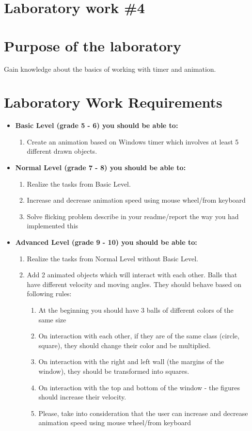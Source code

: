 \section*{Laboratory work \#4}

\section{Purpose of the laboratory}
Gain knowledge about the basics of working with timer and animation.
\section{Laboratory Work Requirements}
\begin{itemize}
\item \textbf{Basic Level (grade 5 - 6) you should be able to:}
	\begin{enumerate}
	\item Create an animation based on Windows timer which involves at least 5 different drawn objects.
    \end{enumerate}
	
\item \textbf{Normal Level (grade 7 - 8) you should be able to:}
    \begin{enumerate}
    \item Realize the tasks from Basic Level.
    \item Increase and decrease animation speed using mouse wheel/from keyboard
    \item Solve flicking problem describe in your readme/report the way you had implemented this
    \end{enumerate}
          
\item \textbf{Advanced Level (grade 9 - 10) you should be able to:}
    \begin{enumerate} 
    \item Realize the tasks from Normal Level without Basic Level.
    \item Add 2 animated objects which will interact with each other. Balls that have different velocity and moving angles. They should behave based on following rules: 
        \begin{enumerate}
        \item At the beginning you should have 3 balls of different colors of the same size
   	 	\item On interaction with each other, if they are of the same class (circle, square), they should change their color and be multiplied.
    	\item On interaction with the right and left wall (the margins of the window), they should be transformed into squares.
    	\item On interaction with the top and bottom of the window - the figures should increase their velocity.
    	\item Please, take into consideration that the user can increase and decrease animation speed using mouse wheel/from keyboard
		\end{enumerate}
   \end{enumerate}
          

\end{itemize}
